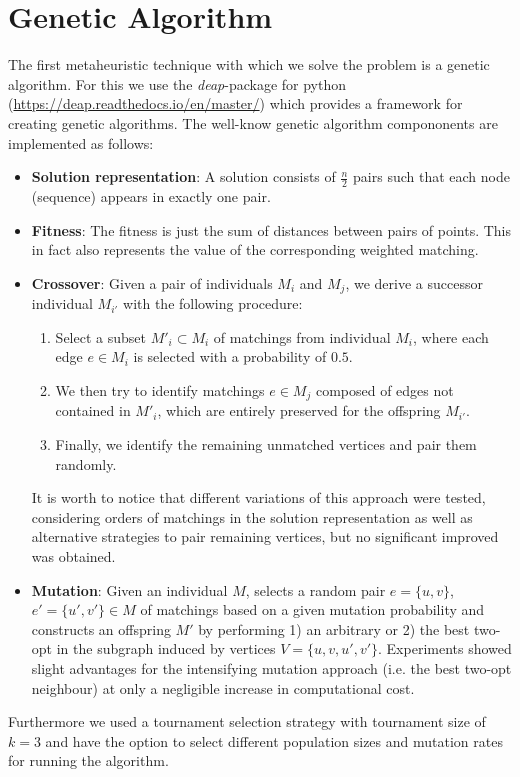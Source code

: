 \documentclass[12pt]{article}
\begin{document}
\section{Genetic Algorithm}
The first metaheuristic technique with which we solve the problem is a genetic algorithm.
For this we use the \textit{deap}-package for python (\url{https://deap.readthedocs.io/en/master/}) which provides a framework for creating genetic algorithms.
The well-know genetic algorithm compononents are implemented as follows:
\begin{itemize}
    \item \textbf{Solution representation}: A solution consists of $\frac{n}{2}$ pairs such that each node (sequence) appears in exactly one pair.
    \item \textbf{Fitness}: The fitness is just the sum of distances between pairs of points. 
    This in fact also represents the value of the corresponding weighted matching.
    \item \textbf{Crossover}: Given a pair of individuals $M_i$ and $M_j$, we derive a successor individual $M_{i'}$ with the following procedure:
    \begin{enumerate}
    	\item Select a subset $M'_i \subset M_i$ of matchings from individual $M_i$, where each edge $e \in M_i$ is selected with a probability of $0.5$. 
    	\item We then try to identify matchings $e \in M_j$ composed of edges not contained in $M'_i$, which are entirely preserved for the offspring $M_{i'}$.
    	\item Finally, we identify the remaining unmatched vertices and pair them randomly. 
    \end{enumerate}
    It is worth to notice that different variations of this approach were tested, considering orders of matchings in the solution representation as well as alternative strategies to pair remaining vertices, but no significant improved was obtained. 
    \item \textbf{Mutation}: Given an individual $M$, selects a random pair $e=\{u,v\}$, $e'=\{u',v'\} \in M$ of matchings based on a given mutation probability and constructs an offspring $M'$ by performing 1) an arbitrary or 2) the best two-opt in the subgraph induced by vertices $V=\{u,v,u',v'\}$. Experiments showed slight advantages for the intensifying mutation approach (i.e. the best two-opt neighbour) at only a negligible increase in computational cost. 
\end{itemize}
Furthermore we used a tournament selection strategy with tournament size of $k=3$ and have the option to select different population sizes and mutation rates for running the algorithm.
\end{document}
